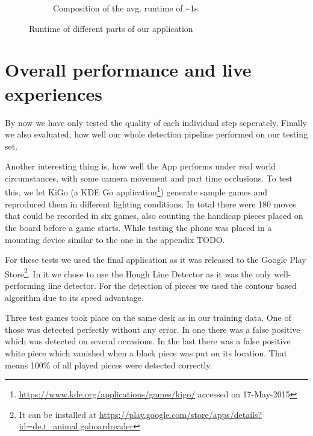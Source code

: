 \begin{figure}
\begin{subfigure}{0.25\textwidth}
\begin{tikzpicture}
			\end{tikzpicture}
			\vspace{1.5em}
			\caption{Composition of the avg. runtime of \textasciitilde1s.}
			\label{fig:timeEvaluation-pie}
		\end{subfigure}

		\caption{Runtime of different parts of our application}
		\label{fig:timeEvaluation}
	\end{figure}




	\section{Overall performance and live experiences}
	\label{evaluation-overallPerformance}
	By now we have only tested the quality of each individual step seperately. Finally we also evaluated, how well our whole detection pipeline performed on our testing set.

	Another interesting thing is, how well the App performs under real world circumstances, with some camera movement and part time occlusions. To test this, we let KiGo (a KDE Go application\footnote{\url{https://www.kde.org/applications/games/kigo/} accessed on 17-May-2015}) generate sample games and reproduced them in different lighting conditions. In total there were 180 moves that could be recorded in six games, also counting the handicap pieces placed on the board before a game starts. While testing the phone was placed in a mounting device similar to the one in the appendix TODO.

	For these tests we used the final application as it was released to the Google Play Store\footnote{It can be installed at \url{https://play.google.com/store/apps/details?id=de.t_animal.goboardreader}}. In it we chose to use the Hough Line Detector as it was the only well-performing line detector. For the detection of pieces we used the contour based algorithm due to its speed advantage.

	Three test games took place on the same desk as in our training data. One of those was detected perfectly without any error. In one there was a false positive which was detected on several occasions. In the last there was a false positive white piece which vanished when a black piece was put on its location. That means 100\% of all played pieces were detected correctly.

